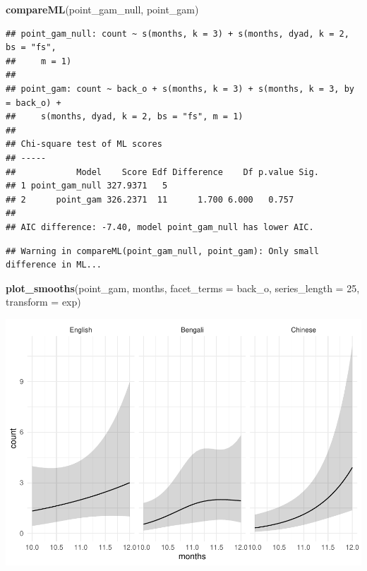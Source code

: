 \documentclass[]{article}
\newenvironment{Shaded}{\begin{snugshade}}{\end{snugshade}}
\newcommand{\DataTypeTok}[1]{\textcolor[rgb]{0.13,0.29,0.53}{#1}}
\newcommand{\DecValTok}[1]{\textcolor[rgb]{0.00,0.00,0.81}{#1}}
\newcommand{\KeywordTok}[1]{\textcolor[rgb]{0.13,0.29,0.53}{\textbf{#1}}}
\newcommand{\NormalTok}[1]{#1}
\begin{document}
\begin{Shaded}
\begin{Highlighting}[]
\KeywordTok{compareML}\NormalTok{(point_gam_null, point_gam)}
\end{Highlighting}
\end{Shaded}

\begin{verbatim}
## point_gam_null: count ~ s(months, k = 3) + s(months, dyad, k = 2, bs = "fs", 
##     m = 1)
## 
## point_gam: count ~ back_o + s(months, k = 3) + s(months, k = 3, by = back_o) + 
##     s(months, dyad, k = 2, bs = "fs", m = 1)
## 
## Chi-square test of ML scores
## -----
##            Model    Score Edf Difference    Df p.value Sig.
## 1 point_gam_null 327.9371   5                              
## 2      point_gam 326.2371  11      1.700 6.000   0.757     
## 
## AIC difference: -7.40, model point_gam_null has lower AIC.
\end{verbatim}

\begin{verbatim}
## Warning in compareML(point_gam_null, point_gam): Only small difference in ML...
\end{verbatim}

\begin{Shaded}
\begin{Highlighting}[]
\KeywordTok{plot_smooths}\NormalTok{(point_gam, months, }\DataTypeTok{facet_terms =}\NormalTok{ back_o, }\DataTypeTok{series_length =} \DecValTok{25}\NormalTok{, }\DataTypeTok{transform =}\NormalTok{ exp)}
\end{Highlighting}
\end{Shaded}

\includegraphics{supplement_files/figure-latex/point-gam-plot-1.pdf}
\end{document}
